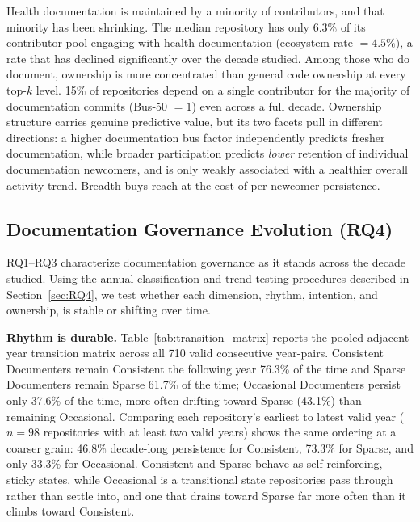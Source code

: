 \documentclass[10pt,conference]{IEEEtran}
\begin{document}
{{\begin{tcolorbox}[
  colback=heatmaplight,
  colframe=heatmapdark,
  coltitle=white,
  fonttitle=\bfseries,
  title=Summary --- RQ3
]
Health documentation is maintained by a
minority of contributors, and that minority has been shrinking. The median repository
has only 6.3\% of its contributor pool engaging with health documentation (ecosystem rate $= 4.5\%$), a rate that has declined significantly over the decade studied. Among those who
do document, ownership is more concentrated than general code ownership at every top-$k$ level. 15\% of repositories depend on a single contributor for the majority of documentation commits (Bus-50 $= 1$) even across a full decade. Ownership structure carries genuine predictive value, but its two facets pull in different directions: a higher documentation bus factor independently predicts fresher documentation, while broader participation predicts \textit{lower} retention of individual documentation newcomers, and is only weakly associated with a healthier overall activity trend. Breadth buys reach at the cost of per-newcomer persistence.
\end{tcolorbox}

\subsection{Documentation Governance Evolution (RQ4)}
\label{sec:evolution}
RQ1--RQ3 characterize documentation governance as it stands across the decade studied. Using the annual classification and trend-testing procedures described in Section~\ref{sec:RQ4}, we test whether each dimension, rhythm, intention, and ownership, is stable or shifting over time.

\textbf{Rhythm is durable.} Table~\ref{tab:transition_matrix} reports the pooled adjacent-year transition matrix across all 710 valid consecutive year-pairs. Consistent Documenters remain Consistent the following year 76.3\% of the time and Sparse Documenters remain Sparse 61.7\% of the time; Occasional Documenters persist only 37.6\% of the time, more often drifting toward Sparse (43.1\%) than remaining Occasional. Comparing each repository's earliest to latest valid year ($n=98$ repositories with at least two valid years) shows the same ordering at a coarser grain: 46.8\% decade-long persistence for Consistent, 73.3\% for Sparse, and only 33.3\% for Occasional. Consistent and Sparse behave as self-reinforcing, sticky states, while Occasional is a transitional state repositories pass through rather than settle into, and one that drains toward Sparse far more often than it climbs toward Consistent.

}}
\end{document}
